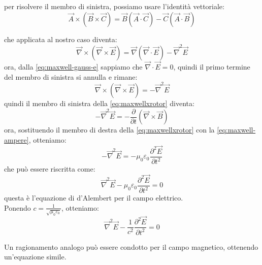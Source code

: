 per risolvere il membro di sinistra, possiamo usare l'identità vettoriale:
\begin{equation}    
    \vec{A} \times (\vec{B} \times \vec{C}) = \vec{B} (\vec{A} \cdot \vec{C}) - \vec{C} (\vec{A} \cdot \vec{B})
\end{equation}

che applicata al nostro caso diventa:
\begin{equation}
    \vec{\nabla} \times (\vec{\nabla} \times \vec{E}) = \vec{\nabla} (\vec{\nabla} \cdot \vec{E}) - \vec{\nabla}^2 \vec{E}
\end{equation}
ora, dalla \eqref{eq:maxwell-gauss-e} sappiamo che $\vec{\nabla} \cdot \vec{E} = 0$, quindi il primo termine del membro di 
sinistra si annulla e rimane:  
\begin{equation}
    \vec{\nabla} \times (\vec{\nabla} \times \vec{E}) = - \vec{\nabla}^2 \vec{E}
\end{equation}
quindi il membro di sinistra della \eqref{eq:maxwellxrotor} diventa:
\begin{equation}
    - \vec{\nabla}^2 \vec{E} = -\frac{\partial}{\partial t} (\vec{\nabla} \times \vec{B})   
\end{equation}
ora, sostituendo il membro di destra della \eqref{eq:maxwellxrotor} con la \eqref{eq:maxwell-ampere}, otteniamo:
\begin{equation}
    - \vec{\nabla}^2 \vec{E} = -\mu_0 \varepsilon_0 \frac{\partial^2 \vec{E}}{\partial t^2}
\end{equation}
che può essere riscritta come:
\begin{equation}
    \vec{\nabla}^2 \vec{E} - \mu_0 \varepsilon_0 \frac{\partial^2 \vec{E}}{\partial t^2} = 0
\end{equation}
questa è l'equazione di d'Alembert per il campo elettrico.\\ 
Ponendo $c = \frac{1}{\sqrt{\mu_0 \varepsilon_0}}$, otteniamo:
\begin{equation}
    \vec{\nabla}^2 \vec{E} - \frac{1}{c^2} \frac{\partial^2 \vec{E}}{\partial t^2} = 0  
\end{equation}

Un ragionamento analogo può essere condotto per il campo magnetico, ottenendo un'equazione simile.